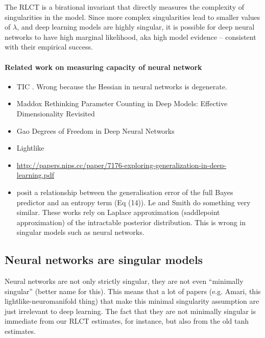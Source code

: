 \documentclass{article} %
\begin{document}
The RLCT is a birational invariant \citep{kollar_birational_1998} that directly measures the complexity of singularities in the model. Since more complex singularities lead to smaller values of $\lambda$, and deep learning models are highly singular, it is possible for deep neural networks to have high marginal likelihood, aka high model evidence -- consistent with their empirical success. 

\paragraph{Related work on measuring capacity of neural network}
\begin{itemize}
    \item TIC \cite{thomas_information_2019}. Wrong because the Hessian in neural networks is degenerate.
    \item Maddox \cite{maddox_rethinking_2020} Rethinking Parameter Counting in Deep Models: Effective Dimensionality Revisited
    \item Gao \cite{gao_degrees_2016} Degrees of Freedom in Deep Neural Networks
    \item Lightlike \cite{sun_lightlike_2020}
    \item \url{http://papers.nips.cc/paper/7176-exploring-generalization-in-deep-learning.pdf}
    \item \cite{zhang_energyentropy_2018} posit a relationship between the generalisation error of the full Bayes predictor and an entropy term (Eq (14)). Le and Smith \cite{le_bayesian_2018} do something very similar. These works rely on Laplace approximation (saddlepoint approximation) of the intractable posterior distribution. This is wrong in singular models such as neural networks. 
\end{itemize} 

\subsection{Neural networks are singular models}
\label{section:nn_singular}

Neural networks are not only strictly singular, they are not even ``minimally singular'' (better name for this). This means that a lot of papers (e.g. Amari, this lightlike-neuromanifold thing) that make this minimal singularity assumption are just irrelevant to deep learning. The fact that they are not minimally singular is immediate from our RLCT estimates, for instance, but also from the old tanh estimates.
\end{document}
